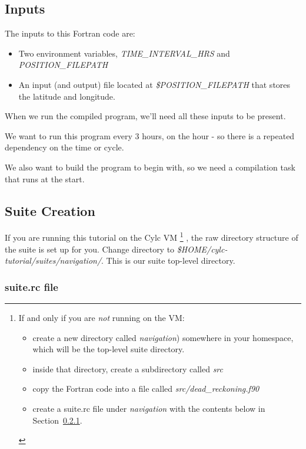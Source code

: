 \subsection{Inputs}

The inputs to this Fortran code are:
\begin{itemize}
    \item Two environment variables, {\em TIME\_INTERVAL\_HRS} and {\em POSITION\_FILEPATH}
    \item An input (and output) file located at {\em \$POSITION\_FILEPATH} that stores the latitude and longitude.
\end{itemize}

When we run the compiled program, we'll need all these inputs to be present.

We want to run this program every 3 hours, on the hour - so there is a repeated dependency on the time or cycle.

We also want to build the program to begin with, so we need a compilation task that runs at the start.

\subsection{Suite Creation}

If you are running this tutorial on the Cylc VM \footnote{
    If and only if you are {\em not} running on the VM:
\begin{itemize}
    \item create a new directory called {\em navigation}) somewhere in your homespace, which will be the top-level suite directory.
    \item inside that directory, create a subdirectory called {\em src}
    \item copy the Fortran code into a file called {\em src/dead\_reckoning.f90}
    \item create a suite.rc file under {\em navigation} with the contents below in Section~\ref{Suite Writing suite.rc file}.
\end{itemize}
} , the raw directory structure of the suite is set up for you. Change directory to {\em \$HOME/cylc-tutorial/suites/navigation/}. This is our suite top-level directory.

\subsubsection{suite.rc file}
\label{Suite Writing suite.rc file}

